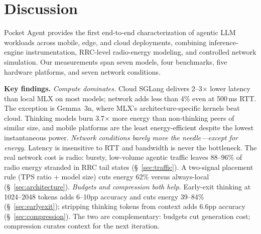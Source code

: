 \documentclass[sigconf,anonymous,review]{acmart}
\begin{document}
\section{Discussion}
\label{sec:discussion}

Pocket Agent provides the first end-to-end characterization of agentic LLM workloads across mobile, edge, and cloud deployments, combining inference-engine instrumentation, RRC-level radio-energy modeling, and controlled network simulation. Our measurements span seven models, four benchmarks, five hardware platforms, and seven network conditions.

\noindent \textbf{Key findings.} \emph{Compute dominates.} Cloud SGLang delivers 2--3$\times$ lower latency than local MLX on most models; network adds less than 4\% even at 500\,ms RTT. The exception is Gemma~3n, where MLX's architecture-specific kernels beat cloud. Thinking models burn 3.7$\times$ more energy than non-thinking peers of similar size, and mobile platforms are the least energy-efficient despite the lowest instantaneous power. \emph{Network conditions barely move the needle---except for energy.} Latency is insensitive to RTT and bandwidth is never the bottleneck. The real network cost is radio: bursty, low-volume agentic traffic leaves 88--96\% of radio energy stranded in RRC tail states (§~\ref{sec:traffic}). A two-signal placement rule (TPS ratio + model size) cuts energy 62\% versus always-local (§~\ref{sec:architecture}). \emph{Budgets and compression both help.} Early-exit thinking at 1024--2048 tokens adds 6--10pp accuracy and cuts energy 39--84\% (§~\ref{sec:earlyexit}); stripping thinking tokens from context adds 6.6pp accuracy (§~\ref{sec:compression}). The two are complementary: budgets cut generation cost; compression curates context for the next iteration.
\end{document}
